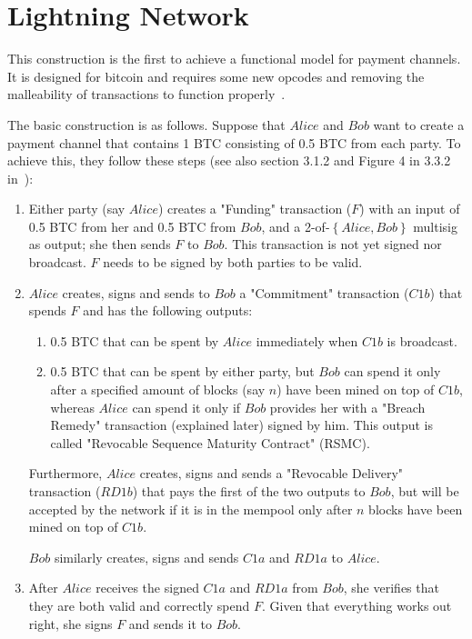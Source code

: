\section{Lightning Network}
  This construction is the first to achieve a functional model for payment channels. It
  is designed for bitcoin and requires some new opcodes and removing the malleability of
  transactions to function properly~\cite{lightning}.

  The basic construction is as follows. Suppose that $Alice$ and $Bob$ want to create a
  payment channel that contains 1 BTC consisting of 0.5 BTC from each party. To achieve
  this, they follow these steps (see also section 3.1.2 and Figure 4 in 3.3.2
  in~\cite{lightning}):
  \begin{enumerate}
    \item Either party (say $Alice$) creates a "Funding" transaction ($F$) with an input
    of 0.5 BTC from her and 0.5 BTC from $Bob$, and a 2-of-$\left\{Alice, Bob\right\}$
    multisig as output; she then sends $F$ to $Bob$. This transaction is not yet signed
    nor broadcast. $F$ needs to be signed by both parties to be valid.

    \item $Alice$ creates, signs and sends to $Bob$ a "Commitment" transaction ($C1b$)
    that spends $F$ and has the following outputs:
    \begin{enumerate}
      \item 0.5 BTC that can be spent by $Alice$ immediately when $C1b$ is broadcast.
      \item 0.5 BTC that can be spent by either party, but $Bob$ can spend it only after
      a specified amount of blocks (say $n$) have been mined on top of $C1b$, whereas
      $Alice$ can spend it only if $Bob$ provides her with a "Breach Remedy" transaction
      (explained later) signed by him. This output is called "Revocable Sequence Maturity
      Contract" (RSMC).
    \end{enumerate}
    Furthermore, $Alice$ creates, signs and sends a "Revocable Delivery" transaction
    ($RD1b$) that pays the first of the two outputs to $Bob$, but will be accepted by the
    network if it is in the mempool only after $n$ blocks have been mined on top of $C1b$.

    $Bob$ similarly creates, signs and sends $C1a$ and $RD1a$ to $Alice$.

    \item After $Alice$ receives the signed $C1a$ and $RD1a$ from $Bob$, she verifies that
    they are both valid and correctly spend $F$. Given that everything works out right,
    she signs $F$ and sends it to $Bob$.


\end{enumerate}

